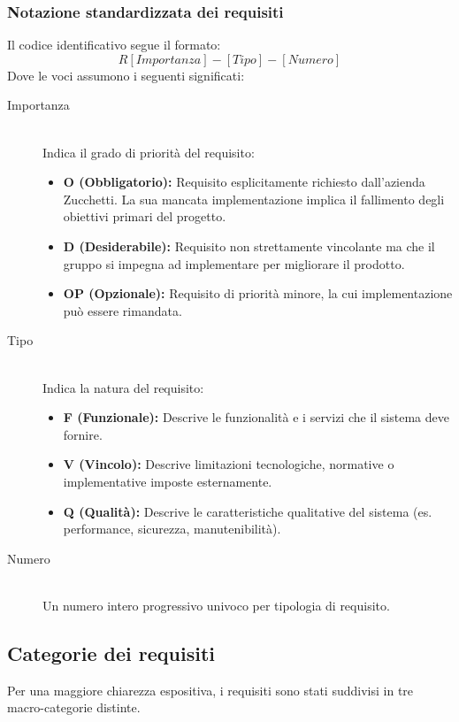 \documentclass[11pt,a4paper]{article}
\begin{document}
\subsubsection{Notazione standardizzata dei requisiti}
Il codice identificativo segue il formato:
\[
R[Importanza]-[Tipo]-[Numero]
\]
Dove le voci assumono i seguenti significati:

\begin{description}
    \item[Importanza] \hfill \\
    Indica il grado di priorità del requisito:
    \begin{itemize}
        \item \textbf{O (Obbligatorio):} Requisito esplicitamente richiesto dall'azienda Zucchetti. La sua mancata implementazione implica il fallimento degli obiettivi primari del progetto.
        \item \textbf{D (Desiderabile):} Requisito non strettamente vincolante ma che il gruppo si impegna ad implementare per migliorare il prodotto.
        \item \textbf{OP (Opzionale):} Requisito di priorità minore, la cui implementazione può essere rimandata.
    \end{itemize}
    
    \item[Tipo] \hfill \\
    Indica la natura del requisito:
    \begin{itemize}
        \item \textbf{F (Funzionale):} Descrive le funzionalità e i servizi che il sistema deve fornire.
        \item \textbf{V (Vincolo):} Descrive limitazioni tecnologiche, normative o implementative imposte esternamente.
        \item \textbf{Q (Qualità):} Descrive le caratteristiche qualitative del sistema (es. performance, sicurezza, manutenibilità).
    \end{itemize}
    
    \item[Numero] \hfill \\
    Un numero intero progressivo univoco per tipologia di requisito.
\end{description}

\subsection{Categorie dei requisiti}
Per una maggiore chiarezza espositiva, i requisiti sono stati suddivisi in tre macro-categorie distinte.
\end{document}
